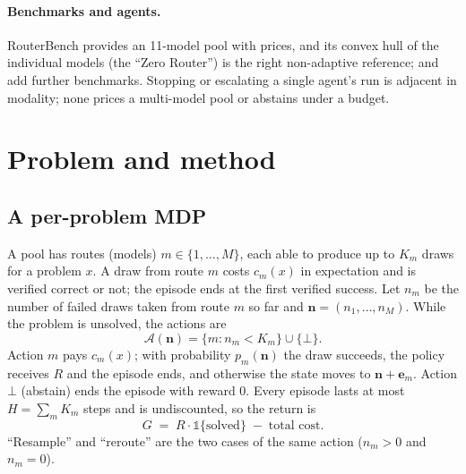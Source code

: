 \documentclass[10pt]{article} %
\newcommand{\abst}{\bot}
\begin{document}
\paragraph{Benchmarks and agents.}
RouterBench \citep{hu2024routerbench} provides an 11-model pool with prices, and its convex hull
of the individual models (the ``Zero Router'') is the right non-adaptive reference;
\citet{llmrouterbench2026} and \citet{agentrouter2026} add further benchmarks.  Stopping or
escalating a single agent's run \citep{agentstop2026,failfast2026,swerouter2026,cope2025} is
adjacent in modality; none prices a multi-model pool or abstains under a budget.

\section{Problem and method}
\label{sec:method}

\subsection{A per-problem MDP}
\label{sec:mdp}

A pool has routes (models) $m\in\{1,\dots,M\}$, each able to produce up to $K_m$ draws for a
problem $x$.  A draw from route $m$ costs $c_m(x)$ in expectation and is verified correct or not;
the episode ends at the first verified success.  Let $n_m$ be the number of failed draws taken
from route $m$ so far and $\mathbf n=(n_1,\dots,n_M)$.  While the problem is unsolved, the
actions are
\[
\mathcal A(\mathbf n)=\{m : n_m<K_m\}\cup\{\abst\}.
\]
Action $m$ pays $c_m(x)$; with probability $p_m(\mathbf n)$ the draw succeeds, the policy
receives $R$ and the episode ends, and otherwise the state moves to $\mathbf n+\mathbf e_m$.
Action $\abst$ (abstain) ends the episode with reward $0$.  Every episode lasts at most
$H=\sum_m K_m$ steps and is undiscounted, so the return is
\[
G \;=\; R\cdot\mathbb 1\{\text{solved}\}\;-\;\text{total cost}.
\]
``Resample'' and ``reroute'' are the two cases of the same action ($n_m>0$ and $n_m=0$).
\end{document}
